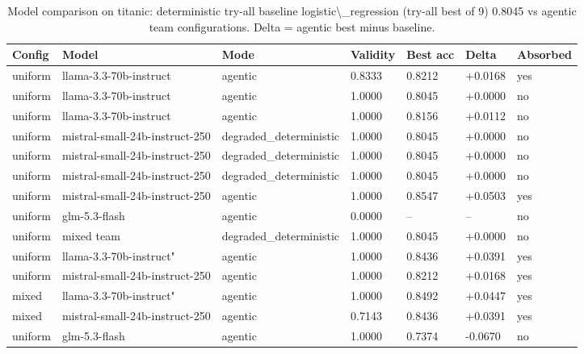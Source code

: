 \begin{table}[H]
\centering\small
\caption{Model comparison on titanic: deterministic try-all baseline logistic\textbackslash{}\_regression (try-all best of 9) 0.8045 vs agentic team configurations. Delta = agentic best minus baseline.}
\label{tab:model-comparison-model-comparison-titanic}
\begin{tabular}{lllllll}
\toprule
Config & Model & Mode & Validity & Best acc & Delta & Absorbed \\
\midrule
uniform & llama-3.3-70b-instruct & agentic & 0.8333 & 0.8212 & +0.0168 & yes \\
uniform & llama-3.3-70b-instruct & agentic & 1.0000 & 0.8045 & +0.0000 & no \\
uniform & llama-3.3-70b-instruct & agentic & 1.0000 & 0.8156 & +0.0112 & no \\
uniform & mistral-small-24b-instruct-250 & degraded\_deterministic & 1.0000 & 0.8045 & +0.0000 & no \\
uniform & mistral-small-24b-instruct-250 & degraded\_deterministic & 1.0000 & 0.8045 & +0.0000 & no \\
uniform & mistral-small-24b-instruct-250 & degraded\_deterministic & 1.0000 & 0.8045 & +0.0000 & no \\
uniform & mistral-small-24b-instruct-250 & agentic & 1.0000 & 0.8547 & +0.0503 & yes \\
uniform & glm-5.3-flash & agentic & 0.0000 & -- & -- & no \\
uniform & mixed team & degraded\_deterministic & 1.0000 & 0.8045 & +0.0000 & no \\
uniform & llama-3.3-70b-instruct"} & agentic & 1.0000 & 0.8436 & +0.0391 & yes \\
uniform & mistral-small-24b-instruct-250 & agentic & 1.0000 & 0.8212 & +0.0168 & yes \\
mixed & llama-3.3-70b-instruct"} & agentic & 1.0000 & 0.8492 & +0.0447 & yes \\
mixed & mistral-small-24b-instruct-250 & agentic & 0.7143 & 0.8436 & +0.0391 & yes \\
uniform & glm-5.3-flash & agentic & 1.0000 & 0.7374 & -0.0670 & no \\
\bottomrule
\end{tabular}
\end{table}
